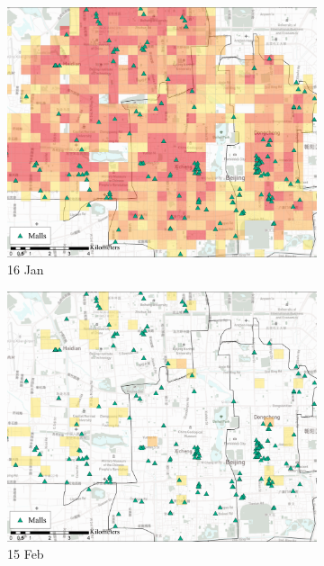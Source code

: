 \documentclass[preprints,ijgi,submit,moreauthors]{Definitions/mdpi}
\begin{document}
\begin{figure}[H]
    \centering
    \begin{subfigure}{.32\textwidth}
        \includegraphics[width=\textwidth]{Figures/Relation_with_POIs/POIsMallD2020_01_16.pdf}
        \caption{16 Jan}
    \end{subfigure}
    \begin{subfigure}{.32\textwidth}
        \includegraphics[width=\textwidth]{Figures/Relation_with_POIs/POIsMallD2020_02_15.pdf}
        \caption{15 Feb}
    \end{subfigure}
    \begin{subfigure}{.32\textwidth}

\end{subfigure}
\end{figure}
\end{document}
